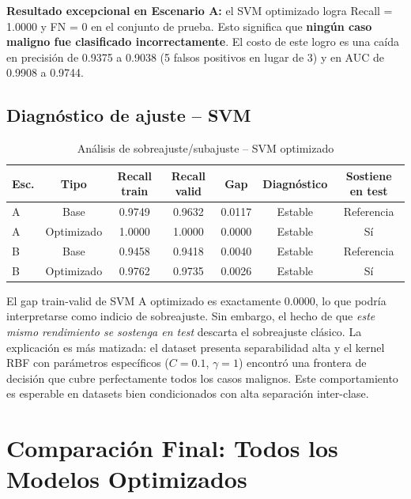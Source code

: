 \documentclass[11pt,a4paper]{article}
\begin{document}
\textbf{Resultado excepcional en Escenario A:} el SVM optimizado logra Recall = 1.0000 y FN = 0 en el conjunto de prueba. Esto significa que \textbf{ningún caso maligno fue clasificado incorrectamente}. El costo de este logro es una caída en precisión de 0.9375 a 0.9038 (5 falsos positivos en lugar de 3) y en AUC de 0.9908 a 0.9744.

\subsection{Diagnóstico de ajuste -- SVM}

\begin{table}[H]
\centering
\caption{Análisis de sobreajuste/subajuste -- SVM optimizado}
\renewcommand{\arraystretch}{1.15}
\begin{tabular}{lcccccc}
\toprule
\textbf{Esc.} & \textbf{Tipo} & \textbf{Recall train} & \textbf{Recall valid} & \textbf{Gap} & \textbf{Diagnóstico} & \textbf{Sostiene en test} \\
\midrule
A & Base & 0.9749 & 0.9632 & 0.0117 & Estable & Referencia \\
\rowcolor{bestrow}
A & Optimizado & 1.0000 & 1.0000 & 0.0000 & Estable & Sí \\
B & Base & 0.9458 & 0.9418 & 0.0040 & Estable & Referencia \\
\rowcolor{neutralrow}
B & Optimizado & 0.9762 & 0.9735 & 0.0026 & Estable & Sí \\
\bottomrule
\end{tabular}
\end{table}

El gap train-valid de SVM A optimizado es exactamente 0.0000, lo que podría interpretarse como indicio de sobreajuste. Sin embargo, el hecho de que \textit{este mismo rendimiento se sostenga en test} descarta el sobreajuste clásico. La explicación es más matizada: el dataset presenta separabilidad alta y el kernel RBF con parámetros específicos ($C=0.1$, $\gamma=1$) encontró una frontera de decisión que cubre perfectamente todos los casos malignos. Este comportamiento es esperable en datasets bien condicionados con alta separación inter-clase.

\section{Comparación Final: Todos los Modelos Optimizados}
\end{document}
